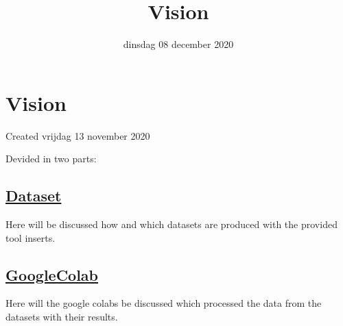 \documentclass{scrartcl}
\title{Vision}
\date{dinsdag 08 december 2020}
\author{}
\begin{document}
\maketitle

		\section{Vision}

Created vrijdag 13 november 2020



Devided in two parts:



\subsection{\href{./Vision/Dataset.tex}{Dataset}}

Here will be discussed how and which datasets are produced with the provided tool inserts. 



\subsection{\href{./Vision/GoogleColab.tex}{GoogleColab}}

Here will the google colabs be discussed which processed the data from the datasets with their results.
\end{document}
